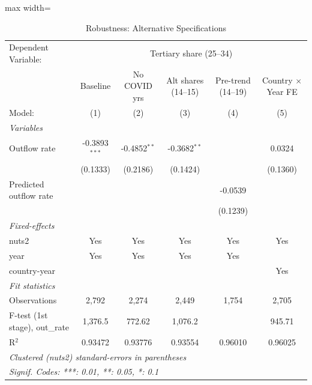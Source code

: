 \begin{table}[htbp]
   \caption{\label{tab:robustness} Robustness: Alternative Specifications}
   \centering
   \scriptsize
   \begin{adjustbox}{max width=\textwidth}
   \begin{tabular}{lccccc}
      \tabularnewline \midrule \midrule
      Dependent Variable: & \multicolumn{5}{c}{Tertiary share (25--34)}\\
                                     & Baseline        & No COVID yrs   & Alt shares (14--15) & Pre-trend (14--19) & Country $\times$ Year FE \\    
      Model:                         & (1)             & (2)            & (3)                 & (4)                & (5)\\  
      \midrule
      \emph{Variables}\\
      Outflow rate                   & -0.3893$^{***}$ & -0.4852$^{**}$ & -0.3682$^{**}$      &                    & 0.0324\\   
                                     & (0.1333)        & (0.2186)       & (0.1424)            &                    & (0.1360)\\   
      Predicted outflow rate         &                 &                &                     & -0.0539            &   \\   
                                     &                 &                &                     & (0.1239)           &   \\   
      \midrule
      \emph{Fixed-effects}\\
      nuts2                          & Yes             & Yes            & Yes                 & Yes                & Yes\\  
      year                           & Yes             & Yes            & Yes                 & Yes                & \\  
      country-year                   &                 &                &                     &                    & Yes\\  
      \midrule
      \emph{Fit statistics}\\
      Observations                   & 2,792           & 2,274          & 2,449               & 1,754              & 2,705\\  
      F-test (1st stage), out\_rate  & 1,376.5         & 772.62         & 1,076.2             &                    & 945.71\\  
      R$^2$                          & 0.93472         & 0.93776        & 0.93554             & 0.96010            & 0.96025\\  
      \midrule \midrule
      \multicolumn{6}{p{0.9\textwidth}}{\emph{Clustered (nuts2) standard-errors in parentheses}}\\
      \multicolumn{6}{p{0.9\textwidth}}{\emph{Signif. Codes: ***: 0.01, **: 0.05, *: 0.1}}\\
   \end{tabular}
   \end{adjustbox}
\end{table}
